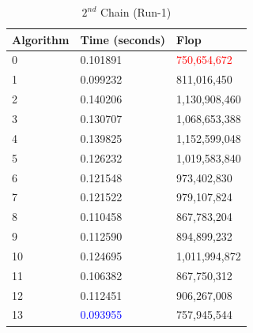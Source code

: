 \documentclass[10pts]{article}
\begin{document}
    
    \begin{table}[htp!]
    	\centering
    	\begin{center}
    	\begin{tabular}{| l | l | l |}
    		\hline
    		\textbf{Algorithm}  & \textbf{Time} (seconds) & \textbf{Flop}\\
    		\hline	
    			0 & 0.101891 &\textcolor{red}{750,654,672}\\ 		
    			1 &	0.099232 &	811,016,450 \\	
    			2 &	0.140206 &	1,130,908,460 \\		
    			3 &	0.130707 &	1,068,653,388\\
    			4 &	0.139825 &	1,152,599,048 \\		
    			5 &	0.126232 &	1,019,583,840	\\	
    			6 &	0.121548 &	973,402,830 	\\	
    			7 &	0.121522 &	979,107,824	\\	
    			8 &	0.110458 &	867,783,204	\\	
    			9 &	0.112590 &	894,899,232 	\\	
    			10 &	0.124695 &	1,011,994,872 \\		
    			11 &	0.106382 &	867,750,312 	\\	
    			12 &	0.112451 &	906,267,008 	\\	
    			13 &    \textcolor{blue}{0.093955} &757,945,544	\\
    			\hline
    		\end{tabular}		
    	\end{center}
    	\caption{$2^{nd}$ Chain (Run-1)}
    	\label{table:$2^{nd}$ Chain (Run-1)}
    \end{table}
    
\newpage   
	
\end{document}

